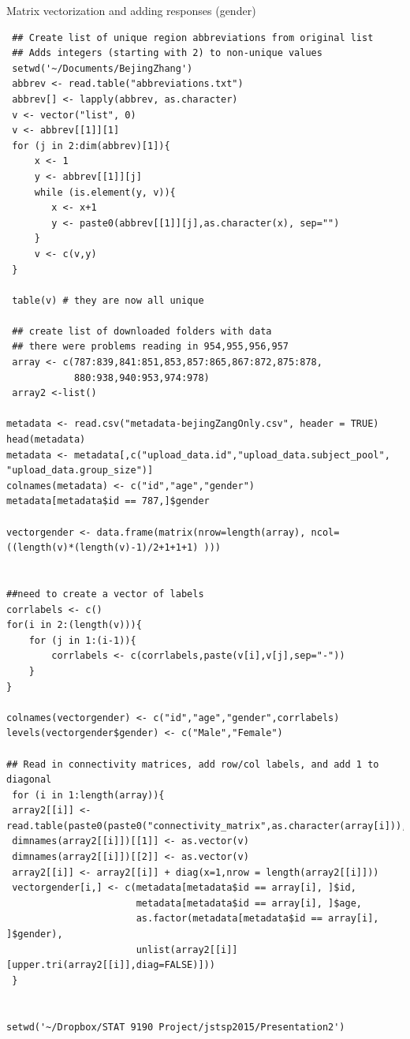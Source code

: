 \documentclass[bigger]{beamer}
\begin{document}
\begin{frame}[fragile,label=sec-1-0-2]{Matrix vectorization and adding responses (gender)}
 \begin{verbatim}
 ## Create list of unique region abbreviations from original list
 ## Adds integers (starting with 2) to non-unique values
 setwd('~/Documents/BejingZhang')
 abbrev <- read.table("abbreviations.txt")
 abbrev[] <- lapply(abbrev, as.character)
 v <- vector("list", 0)
 v <- abbrev[[1]][1]
 for (j in 2:dim(abbrev)[1]){
     x <- 1
     y <- abbrev[[1]][j]
     while (is.element(y, v)){
        x <- x+1
        y <- paste0(abbrev[[1]][j],as.character(x), sep="")
     }
     v <- c(v,y)
 }

 table(v) # they are now all unique

 ## create list of downloaded folders with data
 ## there were problems reading in 954,955,956,957
 array <- c(787:839,841:851,853,857:865,867:872,875:878,
            880:938,940:953,974:978)
 array2 <-list()

metadata <- read.csv("metadata-bejingZangOnly.csv", header = TRUE)
head(metadata)
metadata <- metadata[,c("upload_data.id","upload_data.subject_pool", "upload_data.group_size")]
colnames(metadata) <- c("id","age","gender")
metadata[metadata$id == 787,]$gender

vectorgender <- data.frame(matrix(nrow=length(array), ncol=((length(v)*(length(v)-1)/2+1+1+1) )))


##need to create a vector of labels
corrlabels <- c()
for(i in 2:(length(v))){
    for (j in 1:(i-1)){
        corrlabels <- c(corrlabels,paste(v[i],v[j],sep="-"))
    }
}

colnames(vectorgender) <- c("id","age","gender",corrlabels)
levels(vectorgender$gender) <- c("Male","Female")

## Read in connectivity matrices, add row/col labels, and add 1 to diagonal
 for (i in 1:length(array)){
 array2[[i]] <- read.table(paste0(paste0("connectivity_matrix",as.character(array[i])),".txt"))
 dimnames(array2[[i]])[[1]] <- as.vector(v)
 dimnames(array2[[i]])[[2]] <- as.vector(v)
 array2[[i]] <- array2[[i]] + diag(x=1,nrow = length(array2[[i]]))
 vectorgender[i,] <- c(metadata[metadata$id == array[i], ]$id,
                       metadata[metadata$id == array[i], ]$age,
                       as.factor(metadata[metadata$id == array[i], ]$gender),
                       unlist(array2[[i]][upper.tri(array2[[i]],diag=FALSE)]))
 }


setwd('~/Dropbox/STAT 9190 Project/jstsp2015/Presentation2')
\end{verbatim}
\end{frame}
\end{document}
